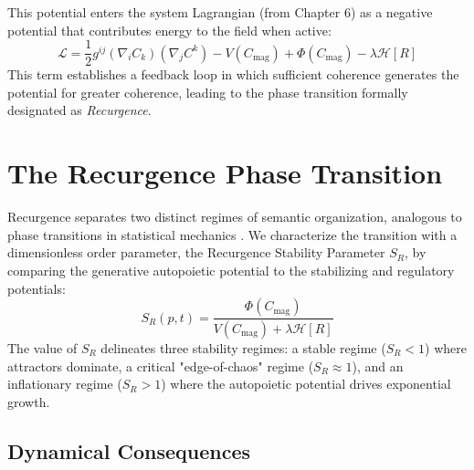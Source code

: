 This potential enters the system Lagrangian (from Chapter 6) as a negative potential that contributes energy to the field when active:
\begin{equation}
\mathcal{L} = \frac{1}{2} g^{ij} (\nabla_i C_k)(\nabla_j C^k) - V(C_{\mathrm{mag}}) + \Phi(C_{\mathrm{mag}}) - \lambda \mathcal{H}[R]
\end{equation}
This term establishes a feedback loop in which sufficient coherence generates the potential for greater coherence, leading to the phase transition formally designated as \textit{Recurgence}.


\section{The Recurgence Phase Transition}
\label{sec:the_recurgence_phase_transition}

Recurgence separates two distinct regimes of semantic organization, analogous to phase transitions in statistical mechanics \autocite{Landau1937, Stanley1971, Goldenfeld1992}. We characterize the transition with a dimensionless order parameter, the Recurgence Stability Parameter \(S_R\), by comparing the generative autopoietic potential to the stabilizing and regulatory potentials:
\begin{equation}
S_R(p,t) = \frac{\Phi(C_{\mathrm{mag}})}{V(C_{\mathrm{mag}}) + \lambda \mathcal{H}[R]}
\end{equation}
The value of \(S_R\) delineates three stability regimes: a stable regime (\(S_R < 1\)) where attractors dominate, a critical "edge-of-chaos" regime (\(S_R \approx 1\)), and an inflationary regime (\(S_R > 1\)) where the autopoietic potential drives exponential growth.


\subsection{Dynamical Consequences}
\label{sec:dynamical_consequences}

